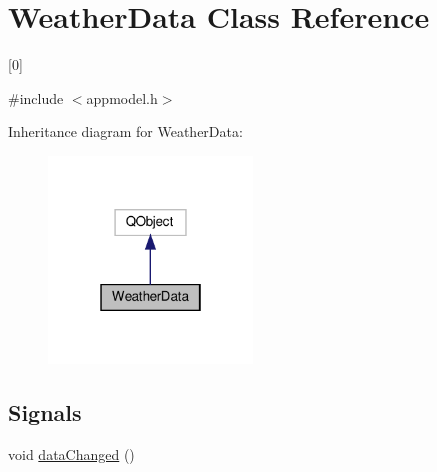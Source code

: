 \hypertarget{class_weather_data}{}\section{Weather\+Data Class Reference}
\label{class_weather_data}


\mbox{[}0\mbox{]}  




{\ttfamily \#include $<$appmodel.\+h$>$}



Inheritance diagram for Weather\+Data\+:\nopagebreak
\begin{figure}[H]
\begin{center}
\leavevmode
\includegraphics[width=154pt]{class_weather_data__inherit__graph}
\end{center}
\end{figure}
\subsection*{Signals}
\begin{DoxyCompactItemize}
\item 
void \hyperlink{class_weather_data_a23185106cf22ef8c57c96154e37b24d1}{data\+Changed} ()
\end{DoxyCompactItemize}
